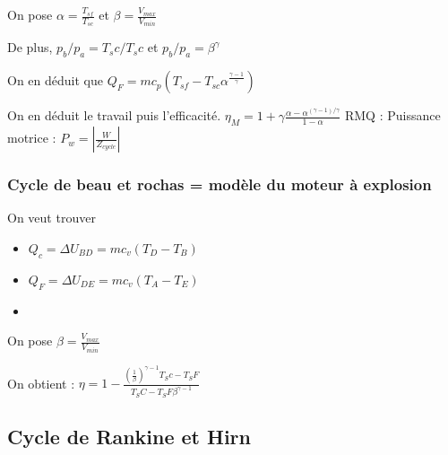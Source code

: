 \documentclass[french]{yLectureNote}
\begin{document}
On pose $\alpha = \frac{T_{sf}}{T_{sc}}$ et $\beta = \frac{V_{max}}{V_{min}}$

De plus, $p_b/p_a = T_sc/T_sc$ et $p_b/p_a = \beta^\gamma$

On en déduit que $Q_F = mc_p(T_{sf}-T_{sc}\alpha^{\frac{\gamma-1}{\gamma}})$

On en déduit le travail puis l'efficacité.
$\eta_M = 1+ \gamma \frac{\alpha-\alpha^{(\gamma-1)/\gamma}}{1-\alpha}$
RMQ : Puissance motrice : $P_w = |\frac{W}{Z_{cycle}}|$
\subsubsection{Cycle de beau et rochas = modèle du moteur à explosion}
On veut trouver 
\begin{itemize}
    \item $Q_c = \Delta U_{BD} = mc_v(T_D-T_B)$
    \item $Q_F = \Delta U_{DE} = mc_v(T_A-T_E)$
    \item 
\end{itemize}
On pose $\beta = \frac{V_{max}}{V_{min}}$

On obtient : $\eta = 1- \frac{(\frac{1}{\beta})^{\gamma-1}T_Sc-T_SF}{T_SC-T_SF\beta^{\gamma-1}}$
\subsection{Cycle de Rankine et Hirn}
\end{document}

